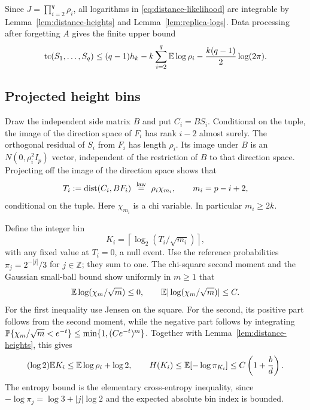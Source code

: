 Since $J=\prod_{i=2}^q\rho_i$, all logarithms in
\eqref{eq:distance-likelihood} are integrable by
Lemma~\ref{lem:distance-heights} and Lemma~\ref{lem:replica-logs}.
Data processing after forgetting $A$ gives the finite upper bound
\begin{equation}\label{eq:distance-correlation-upper}
 \operatorname{tc}(S_1,\ldots,S_q)
 \le(q-1)h_k-k\sum_{i=2}^q\mathbb E\log\rho_i
             -\frac{k(q-1)}2\log(2\pi).
\end{equation}

\subsection{Projected height bins}

Draw the independent side matrix $B$ and put $C_i=BS_i$. Conditional on
the tuple, the image of the direction space of $F_i$ has rank $i-2$
almost surely. The orthogonal residual of $S_i$ from $F_i$ has length
$\rho_i$. Its image under $B$ is an $N(0,\rho_i^2 I_p)$ vector,
independent of the restriction of $B$ to that direction space.
Projecting off the image of the direction space shows that
\begin{equation}\label{eq:distance-projected-height}
 T_i:=\operatorname{dist}(C_i,BF_i)\ \stackrel{\mathrm{law}}=\ \rho_i\chi_{m_i},
 \qquad m_i=p-i+2,
\end{equation}
conditional on the tuple. Here $\chi_{m_i}$ is a chi variable. In
particular $m_i\ge2k$.

Define the integer bin
\[
 K_i=\left\lceil\log_2(T_i/\sqrt{m_i})\right\rceil,
\]
with any fixed value at $T_i=0$, a null event. Use the reference
probabilities $\pi_j=2^{-|j|}/3$ for $j\in\mathbb Z$; they sum to one.
The chi-square second moment and the Gaussian small-ball bound show
uniformly in $m\ge1$ that
\[
 \mathbb E\log(\chi_m/\sqrt m)\le0,\qquad
 \mathbb E|\log(\chi_m/\sqrt m)|\le C.
\]
For the first inequality use Jensen on the square. For the second, its
positive part follows from the second moment, while the negative part follows
by integrating
$\mathbb P\{\chi_m/\sqrt m<e^{-t}\}\le\min\{1,(Ce^{-t})^m\}$.
Together with Lemma~\ref{lem:distance-heights}, this gives
\begin{equation}\label{eq:distance-bin-budget}
 (\log2)\mathbb E K_i\le\mathbb E\log\rho_i+\log2,\qquad
 H(K_i)\le\mathbb E[-\log\pi_{K_i}]
       \le C\left(1+\frac bd\right).
\end{equation}
The entropy bound is the elementary cross-entropy inequality, since
$-\log\pi_j=\log3+|j|\log2$ and the expected absolute bin index is bounded.

